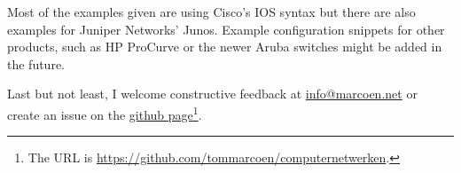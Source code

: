 Most of the examples given are using Cisco's \gls{IOS} syntax but there are also examples for Juniper Networks' Junos.
Example configuration snippets for other products, such as HP ProCurve or the newer Aruba switches might be added in the future.

Last but not least, I welcome constructive feedback at \href{mailto:info@marcoen.net}{info@\-marcoen.net} or create an issue on the \href{https://github.com/tommarcoen/computernetwerken}{github page}\footnote{The \acs{URL} is \url{https://github.com/tommarcoen/computernetwerken}.}.